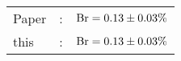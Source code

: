       \begin{tabular}{lcr}
          Paper &:& $\mathrm{Br}  = 0.13\pm 0.03\%$ \\
          this      &:& $\mathrm{Br}  = 0.13\pm 0.03\%$ \\        
      \end{tabular}
